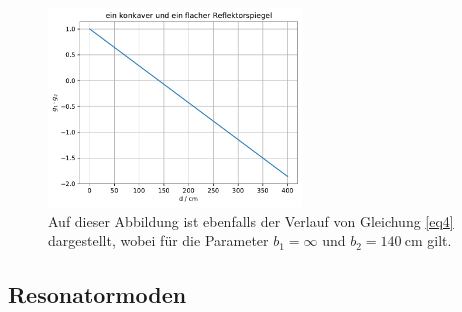 \begin{figure}
    \centering
    \includegraphics[width=0.6\textwidth]{figure/dlin.pdf}
    \caption{Auf dieser Abbildung ist ebenfalls der Verlauf von Gleichung \eqref{eq4}
    dargestellt, wobei für die Parameter $b_{1} = \infty$ und $b_{2} = \SI{140}{\centi\meter}$ 
    gilt.}
    \label{abb2}
\end{figure}

\subsection{Resonatormoden}


